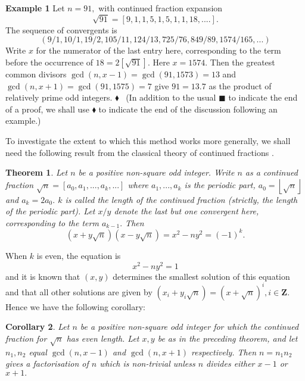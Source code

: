 \documentclass[12pt]{article}
\newtheorem{theorem}{Theorem}
\newtheorem{corollary}[theorem]{Corollary}
\begin{document}
\textbf{Example 1}\label{e1} Let $n=91,$ with continued fraction expansion 
\begin{equation*}
\sqrt{91}=\left[ 9,1,1,5,1,5,1,1,18,....\right] .
\end{equation*}%
The sequence of convergents is%
\begin{equation*}
\left( 9/1,10/1,19/2,105/11,124/13,725/76,849/89,1574/165,...\right) 
\end{equation*}%
Write $x$ for the numerator of the last entry here, corresponding to the
term before the occurrence of $18=2\left[ \sqrt{91}\right] .$ Here $x=1574.$
Then the greatest common divisors $\gcd (n,x-1)=\gcd \left( 91,1573\right)
=13$ and $\gcd (n,x+1)=\gcd \left( 91,1575\right) =7$ give $91=13.7$ as the
product of relatively prime odd integers. $\blacklozenge $ \ (In addition
to the usual $\blacksquare $ to indicate the end of a proof, we shall use $%
\blacklozenge $ to indicate the end of the discussion following an example.)

To investigate the extent to which this method works more generally, we
shall need the following result from the classical theory of continued
fractions \cite[Chapter IV]{Davenport:1970:THA}.

\begin{theorem}
\label{t1}Let $n$ be a positive non-square odd integer. Write $n$ as a
continued fraction $\sqrt{n}=\left[ a_{0},a_{1},...,a_{k},...\right] $ where 
$a_{1},...,a_{k}$ is the periodic part, $a_{0}=\left\lfloor \sqrt{n}%
\right\rfloor $ and $a_{k}=2a_{0}.$ $k$ is called the length of the
continued fraction (strictly, the length of the periodic part). Let $x/y$
denote the last but one convergent here, corresponding to the term $a_{k-1}.$
Then 
\begin{equation}
\left( x+y\sqrt{n}\right) \left( x-y\sqrt{n}\right) =x^{2}-ny^{2}=\left(
-1\right) ^{k}.  \label{inta}
\end{equation}
\end{theorem}

When $k$ is even, the equation is 
\begin{equation}
x^{2}-ny^{2}=1  \label{intb}
\end{equation}%
and it is known that $(x,y)$ determines the smallest solution of this
equation and that all other solutions are given by $\left( x_{i}+y_{i}\sqrt{n%
}\right) =\left( x+\sqrt{n}\right) ^{i},i\in \mathbf{Z.}$Hence we have the
following corollary:

\begin{corollary}
\label{t2}Let $n$ be a positive non-square odd integer for which the
continued fraction for $\sqrt{n}$ has even length. Let $x,y$ be as in the
preceding theorem, and let $n_{1},n_{2}$ equal $\gcd \left( n,x-1\right) $
and $\gcd \left( n,x+1\right) $ respectively. Then $n=n_{1}n_{2}$ gives a
factorisation of $n$ which is non-trivial unless $n$ divides either $x-1$ or 
$x+1.$
\end{corollary}
\end{document}
